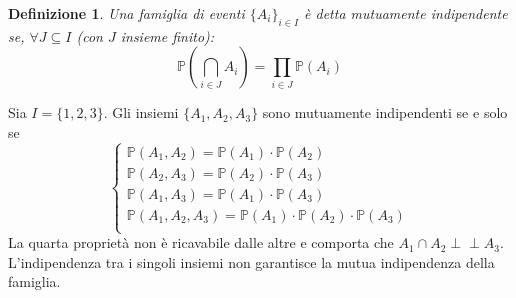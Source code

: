 \documentclass[a4paper,12pt]{article}
\theoremstyle{break}
\newtheorem{definition}{Definizione}[section]
\newcommand{\ind}{\perp\!\!\!\!\perp}
\numberwithin{equation}{section}
\begin{document}
\begin{definition}
  Una famiglia di eventi \(\{A_i\}_{i\in I}\) è detta mutuamente indipendente se, \(\forall J \subseteq I\) (con \(J\) insieme finito):
  \[
    \mathbb{P}\left(\bigcap_{i \in J} A_i\right) = \prod_{i\in J} \mathbb{P}(A_i)
  \]
\end{definition}
Sia \(I = \{1, 2, 3\}\). Gli insiemi \(\{A_1, A_2, A_3\}\) sono mutuamente indipendenti se e solo se 
\[
\begin{cases}
  \mathbb{P}(A_1, A_2) = \mathbb{P}(A_1) \cdot \mathbb{P}(A_2) \\
  \mathbb{P}(A_2, A_3) = \mathbb{P}(A_2) \cdot \mathbb{P}(A_3) \\
  \mathbb{P}(A_1, A_3) = \mathbb{P}(A_1) \cdot \mathbb{P}(A_3) \\
  \mathbb{P}(A_1, A_2, A_3) = \mathbb{P}(A_1) \cdot \mathbb{P}(A_2) \cdot \mathbb{P}(A_3)\\
\end{cases}  
\]
La quarta proprietà non è ricavabile dalle altre e comporta che \(A_1 \cap A_2 \ind A_3\). L'indipendenza tra i singoli insiemi non garantisce la mutua indipendenza della famiglia.
\end{document}
